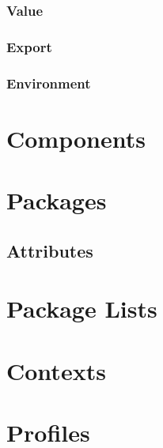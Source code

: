 \documentclass[11pt,a4paper,titlepage]{article}
\begin{document}
\subsubsection{Value}

\subsubsection{Export}

\subsubsection{Environment}

\section{Components}

\section{Packages}

\subsection{Attributes}

\section{Package Lists}

\section{Contexts}

\section{Profiles}
\end{document}
